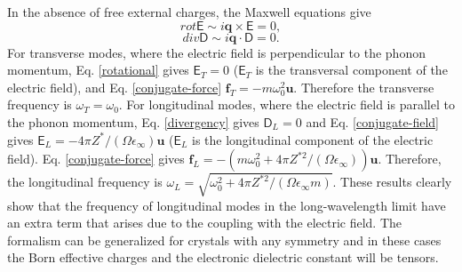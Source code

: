 In the absence of free external charges, the Maxwell equations give
\begin{equation}
 \label{rotational}
 rot\boldsymbol{\mathsf{E}}\sim i\mathbf{q}\times\boldsymbol{\mathsf{E}}=0,
\end{equation}
\begin{equation}
 \label{divergency}
 div\boldsymbol{\mathsf{D}}\sim i\mathbf{q}\cdot\boldsymbol{\mathsf{D}}=0.
\end{equation}
For transverse modes, where the electric field is perpendicular to the phonon momentum, Eq. \ref{rotational} gives $\boldsymbol{\mathsf{E}}_{T}=0$ ($\boldsymbol{\mathsf{E}}_{T}$ is the transversal component of the electric 
field), and Eq. \ref{conjugate-force} $\mathbf{f}_{T}=-m\omega_{0}^{2}\mathbf{u}$. Therefore the transverse frequency is $\omega_{T}=\omega_{0}$. For longitudinal modes, where the electric field is parallel to the phonon 
momentum, Eq. \ref{divergency} gives $\boldsymbol{\mathsf{D}}_{L}=0$ and Eq. \ref{conjugate-field} gives $\boldsymbol{\mathsf{E}}_{L}=-4\pi Z^{*}/(\Omega\epsilon_{\infty})\mathbf{u}$ ($\boldsymbol{\mathsf{E}}_{L}$ is the 
longitudinal component of the electric field). Eq. \ref{conjugate-force} gives $\mathbf{f}_{L}=-(m\omega_{0}^{2}+4\pi Z^{*2}/(\Omega\epsilon_{\infty}))\mathbf{u}$. Therefore, the longitudinal frequency 
is $\omega_{L}=\sqrt{\omega_{0}^{2}+4\pi Z^{*2}/(\Omega\epsilon_{\infty}m)}$. These results clearly show that the frequency of longitudinal modes in the long-wavelength limit have an extra term that arises due to the 
coupling with the electric field. The formalism can be generalized for crystals with any symmetry and in these cases the Born effective charges and the electronic dielectric constant will be tensors. \\

